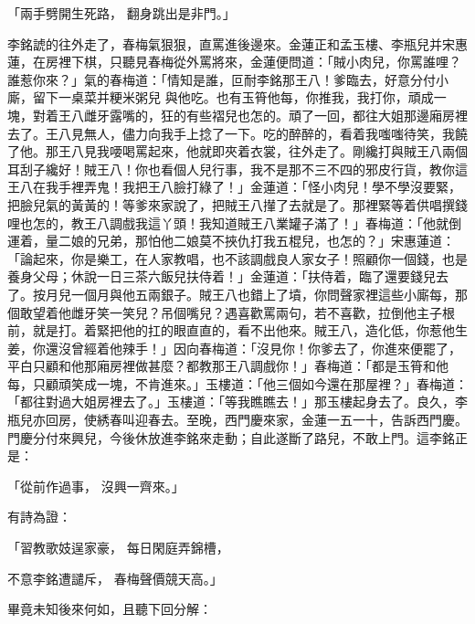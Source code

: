 \begin{showcontents}{}
「兩手劈開生死路，  翻身跳出是非門。」

李銘諕的往外走了，春梅氣狠狠，直罵進後邊來。金蓮正和孟玉樓、李瓶兒并宋惠蓮，在房裡下棋，只聽見春梅從外罵將來，金蓮便問道：「賊小肉兒，你罵誰哩？誰惹你來？」氣的春梅道：「情知是誰，叵耐李銘那王八！爹臨去，好意分付小廝，留下一桌菜并粳米粥兒 與他吃。也有玉筲他每，你推我，我打你，頑成一塊，對着王八雌牙露嘴的，狂的有些褶兒也怎的。頑了一回，都往大姐那邊廂房裡去了。王八見無人，儘力向我手上捻了一下。吃的醉醉的，看着我嗤嗤待笑，我饒了他。那王八見我喓喝罵起來，他就即夾着衣裳，往外走了。剛纔打與賊王八兩個耳刮子纔好！賊王八！你也看個人兒行事，我不是那不三不四的邪皮行貨，教你這王八在我手裡弄鬼！我把王八臉打綠了！」金蓮道：「怪小肉兒！學不學沒要緊，把臉兒氣的黃黃的！等爹來家說了，把賊王八攆了去就是了。那裡緊等着供唱撰錢哩也怎的，教王八調戲我這丫頭！我知道賊王八業罐子滿了！」春梅道：「他就倒運着，量二娘的兄弟，那怕他二娘莫不挾仇打我五棍兒，也怎的？」宋惠蓮道：「論起來，你是樂工，在人家教唱，也不該調戲良人家女子！照顧你一個錢，也是養身父母；休說一日三茶六飯兒扶侍着！」金蓮道：「扶侍着，臨了還要錢兒去了。按月兒一個月與他五兩銀子。賊王八也錯上了墳，你問聲家裡這些小廝每，那個敢望着他雌牙笑一笑兒？吊個嘴兒？遇喜歡罵兩句，若不喜歡，拉倒他主子根前，就是打。着緊把他的扛的眼直直的，看不出他來。賊王八，造化低，你惹他生姜，你還沒曾經着他辣手！」因向春梅道：「沒見你！你爹去了，你進來便罷了，平白只顧和他那廂房裡做甚麼？都教那王八調戲你！」春梅道：「都是玉筲和他每，只顧頑笑成一塊，不肯進來。」玉樓道：「他三個如今還在那屋裡？」春梅道：「都往對過大姐房裡去了。」玉樓道：「等我瞧瞧去！」那玉樓起身去了。良久，李瓶兒亦回房，使綉春叫迎春去。至晚，西門慶來家，金蓮一五一十，告訴西門慶。門慶分付來興兒，今後休放進李銘來走動；自此遂斷了路兒，不敢上門。這李銘正是：

「從前作過事，  沒興一齊來。」

有詩為證：

「習教歌妓逞家豪，  每日閑庭弄錦槽，

不意李銘遭譴斥，  春梅聲價競天高。」

畢竟未知後來何如，且聽下回分解：





\end{showcontents}


